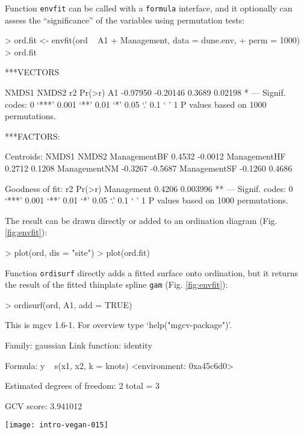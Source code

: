 \documentclass[a4paper,10pt]{amsart}
\begin{document}
Function \texttt{envfit} can be called with a \texttt{formula}
interface, and it optionally can assess the ``significance'' of the
variables using permutation tests:
\begin{Schunk}
\begin{Sinput}
> ord.fit <- envfit(ord ~ A1 + Management, data = dune.env, 
+     perm = 1000)
> ord.fit
\end{Sinput}
\begin{Soutput}
***VECTORS

      NMDS1    NMDS2     r2  Pr(>r)  
A1 -0.97950 -0.20146 0.3689 0.02198 *
---
Signif. codes:  0 ‘***’ 0.001 ‘**’ 0.01 ‘*’ 0.05 ‘.’ 0.1 ‘ ’ 1 
P values based on 1000 permutations.

***FACTORS:

Centroids:
               NMDS1   NMDS2
ManagementBF  0.4532 -0.0012
ManagementHF  0.2712  0.1208
ManagementNM -0.3267 -0.5687
ManagementSF -0.1260  0.4686

Goodness of fit:
               r2   Pr(>r)   
Management 0.4206 0.003996 **
---
Signif. codes:  0 ‘***’ 0.001 ‘**’ 0.01 ‘*’ 0.05 ‘.’ 0.1 ‘ ’ 1 
P values based on 1000 permutations.
\end{Soutput}
\end{Schunk}
The result can be drawn directly or added to an ordination diagram
(Fig. \ref{fig:envfit}):
\begin{Schunk}
\begin{Sinput}
> plot(ord, dis = "site")
> plot(ord.fit)
\end{Sinput}
\end{Schunk}

Function \texttt{ordisurf} directly adds a fitted surface onto
ordination, but it returns the result of the fitted thinplate spline
\texttt{gam} (Fig. \ref{fig:envfit}):
\begin{Schunk}
\begin{Sinput}
> ordisurf(ord, A1, add = TRUE)
\end{Sinput}
\begin{Soutput}
This is mgcv 1.6-1. For overview type `help("mgcv-package")'.

Family: gaussian 
Link function: identity 

Formula:
y ~ s(x1, x2, k = knots)
<environment: 0xa45c6d0>

Estimated degrees of freedom:
2  total = 3 

GCV score: 3.941012
\end{Soutput}
\end{Schunk}
\begin{SCfigure}
\texttt{[image: intro-vegan-015]}
\caption{Fitted vector and smooth surface for the thickness of A1
  horizon (\texttt{A1}, in cm), and centroids of Management levels.}
\label{fig:envfit}
\end{SCfigure}
\end{document}
